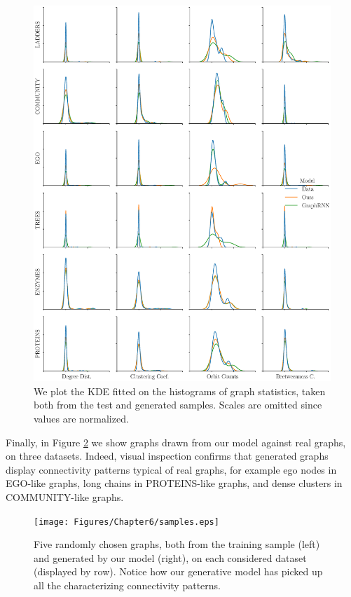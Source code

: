 \begin{figure}[h!]
\centering
\includegraphics[width=\textwidth]{Figures/Chapter6/displot.eps}
\caption{We plot the KDE fitted on the histograms of graph statistics, taken both from the test and generated samples. Scales are omitted since values are normalized.}
\label{fig:distributions}
\end{figure}
Finally, in Figure \ref{fig:samples} we show graphs drawn from our model against real graphs, on three datasets. Indeed, visual inspection confirms that generated graphs display connectivity patterns typical of real graphs, for example ego nodes in EGO-like graphs, long chains in PROTEINS-like graphs, and dense clusters in  COMMUNITY-like graphs.
\begin{figure}[h!]
\centering
\texttt{[image: Figures/Chapter6/samples.eps]}
\caption{Five randomly chosen graphs, both from the training sample (left) and generated by our model (right), on each considered dataset (displayed by row). Notice how our generative model has picked up all the characterizing connectivity patterns.}
\label{fig:samples}
\end{figure}

